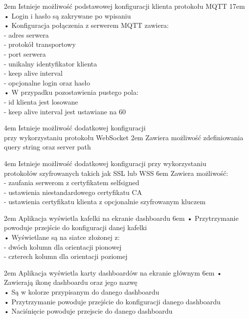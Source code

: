 {2em}{
    Istnieje możliwość podstawowej konfiguracji klienta protokołu MQTT
}
{17em}{
    • Login i hasło są zakrywane po wpisaniu\\

    • Konfiguracja połączenia z serwerem MQTT zawiera:\\
    - adres serwera\\
    - protokół transportowy\\
    - port serwera\\
    - unikalny identyfikator klienta\\
    - keep alive interval\\
    - opcjonalne login oraz hasło\\

    • W przypadku pozostawienia pustego pola:\\
    - id klienta jest losowane\\
    - keep alive interval jest ustawiane na 60
}

{4em}{
    Istnieje możliwość dodatkowej konfiguracji\\
    przy wykorzystaniu protokołu WebSocket
}
{2em}{
    Zawiera możliwość zdefiniowania query string oraz server path
}

{4em}{
    Istnieje możliwość dodatkowej konfiguracji przy wykorzystaniu\\
    protokołów szyfrowanych takich jak SSL lub WSS
}
{6em}{
    Zawiera możliwość:\\
    - zaufania serwerom z certyfikatem selfsigned\\
    - ustawienia niestandardowego certyfikatu CA\\
    - ustawienia certyfikatu klienta z opcjonalnie szyfrowanym kluczem
}

{2em}{
    Aplikacja wyświetla kafelki na ekranie dashboardu
}
{6em}{
    • Przytrzymanie powoduje przejście do konfiguracji danej kafelki\\
    • Wyświetlane są na siatce złożonej z:\\
    - dwóch kolumn dla orientacji pionowej\\
    - czterech kolumn dla orientacji poziomej
}

{2em}{
    Aplikacja wyświetla karty dashboardów na ekranie głównym
}
{6em}{
    • Zawierają ikonę dashboardu oraz jego nazwę\\
    • Są w kolorze przypisanym do danego dashboardu\\
    • Przytrzymanie powoduje przejście do konfiguracji danego dashboardu\\
    • Naciśnięcie powoduje przejscie do danego dashboardu
}


